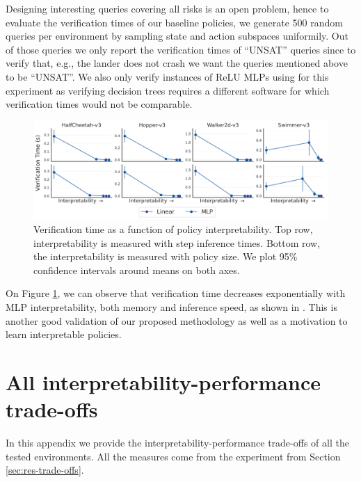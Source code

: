 Designing interesting queries covering all risks is an open problem, hence to evaluate the verification times of our baseline policies, we generate 500 random queries per environment by sampling state and action subspaces uniformily. Out of those queries we only report the verification times of ``UNSAT'' queries since to verify that, e.g., the lander does not crash we want the queries mentioned above to be ``UNSAT''. We also only verify instances of ReLU MLPs using \cite{maraboupy} for this experiment as verifying decision trees requires a different software \cite{z3} for which verification times would not be comparable.
\begin{figure}[ht]
    \centering
    \includegraphics[width=1\linewidth]{images/images_part3/verification_tradeoff.pdf}
    \caption{Verification time as a function of policy interpretability. Top row, interpretability is measured with step inference times. Bottom row, the interpretability is measured with policy size. We plot 95\% confidence intervals around means on both axes.}
    \label{fig:trade-off-verif}
\end{figure}

On Figure \ref{fig:trade-off-verif}, we can observe that verification time decreases exponentially with MLP interpretability, both memory and inference speed, as shown in \cite{lens-complexity}. This is another good validation of our proposed methodology as well as a motivation to learn interpretable policies. 


\section{All interpretability-performance trade-offs}
In this appendix we provide the interpretability-performance trade-offs of all the tested environments. All the measures come from the experiment from Section \ref{sec:res-trade-offs}.

